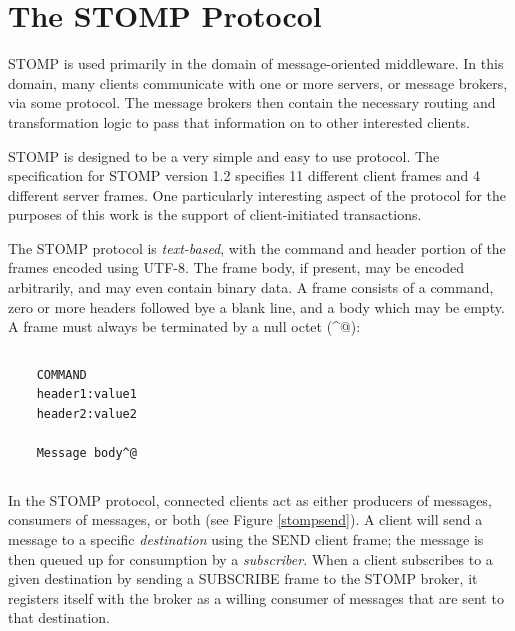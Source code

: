 \documentclass[conference, letterpaper]{IEEEtran}
\begin{document}
\section{The STOMP Protocol}

STOMP is used primarily in the domain of message-oriented middleware. In this domain, many clients
communicate with one or more servers, or message brokers, via some protocol. The message brokers then contain the necessary routing and transformation logic to pass that information on to other interested clients.

STOMP is designed to be a very simple and easy to use protocol. The specification for STOMP version 1.2 specifies 11 different client frames and 4 different server frames. One particularly interesting aspect of the protocol for the purposes of this work is the support of client-initiated transactions.

The STOMP protocol is \textit{text-based}, with the command and header portion of the frames encoded using UTF-8. The frame body, if present, may be encoded arbitrarily, and may even contain binary data. A frame consists of a command, zero or more headers followed bye a blank line, and a body which may be empty. A frame must always be terminated by a null octet (\^{}@):

\begin{verbatim}
\end{verbatim}
\begin{verbatim}
    COMMAND
    header1:value1
    header2:value2

    Message body^@
\end{verbatim}
\begin{verbatim}
\end{verbatim}

In the STOMP protocol, connected clients act as either producers of messages, consumers of messages, or both (see Figure \ref{stompsend}). A client will send a message to a specific \textit{destination} using the SEND client frame; the message is then queued up for consumption by a \textit{subscriber}. When a client subscribes to a given destination by sending a SUBSCRIBE frame to the STOMP broker, it registers itself with the broker as a willing consumer of messages that are sent to that destination.
\end{document}
